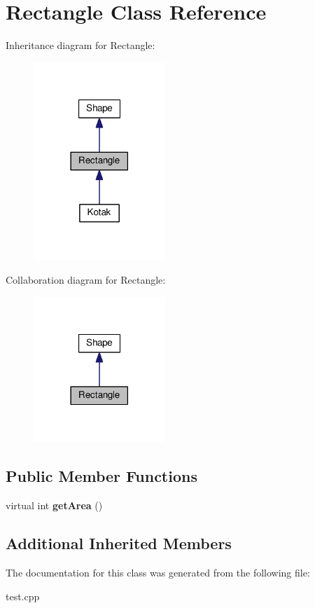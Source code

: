 \hypertarget{classRectangle}{}\section{Rectangle Class Reference}
\label{classRectangle}


Inheritance diagram for Rectangle\+:
\nopagebreak
\begin{figure}[H]
\begin{center}
\leavevmode
\includegraphics[width=141pt]{classRectangle__inherit__graph}
\end{center}
\end{figure}


Collaboration diagram for Rectangle\+:
\nopagebreak
\begin{figure}[H]
\begin{center}
\leavevmode
\includegraphics[width=141pt]{classRectangle__coll__graph}
\end{center}
\end{figure}
\subsection*{Public Member Functions}
\begin{DoxyCompactItemize}
\item 
\mbox{\label{classRectangle_a723f082e5981e3412ae267bfb83e83ba}} 
virtual int {\bfseries get\+Area} ()
\end{DoxyCompactItemize}
\subsection*{Additional Inherited Members}


The documentation for this class was generated from the following file\+:\begin{DoxyCompactItemize}
\item 
test.\+cpp\end{DoxyCompactItemize}

